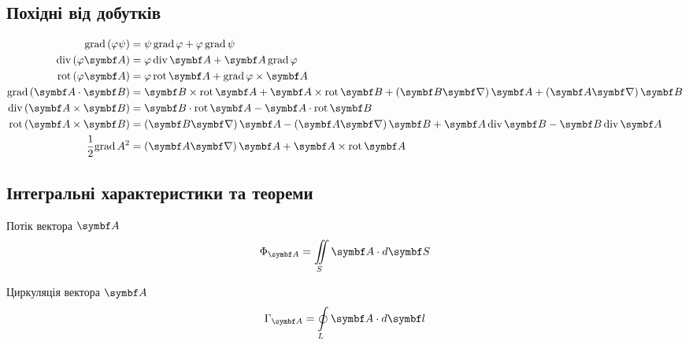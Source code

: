 \subsection{Похідні від добутків}

\begin{align}
	\mathrm{grad}\,(\phi \psi)             & = \psi\,\mathrm{grad}\,\phi +\phi\, \mathrm{grad}\,\psi                                                                                                                           \\
	\mathrm{div}\,(\phi \vect{A})          & = \phi\,\mathrm{div}\,\vect{A} + \vect{A}\,\mathrm{grad}\,\phi                                                                                                                    \\
	\mathrm{rot}\,(\phi \vect{A})          & = \phi\,\mathrm{rot}\,\vect{A} + \mathrm{grad}\,\phi \times \vect{A}                                                                                                              \\
	\mathrm{grad}\,(\vect{A}\cdot\vect{B}) & = \vect{B}\times\mathrm{rot}\,\vect{A} + \vect{A}\times\mathrm{rot}\,\vect{B} + \left( \vect{B}\vect{\nabla}\right)\vect{A} + \left( \vect{A}\vect{\nabla}\right)\vect{B}         \\
	\mathrm{div}\,(\vect{A}\times\vect{B}) & = \vect{B}\cdot\mathrm{rot}\,\vect{A} - \vect{A}\cdot\mathrm{rot}\,\vect{B}                                                                                                       \\
	\mathrm{rot}\,(\vect{A}\times\vect{B}) & = \left( \vect{B}\vect{\nabla}\right)\vect{A} - \left( \vect{A}\vect{\nabla}\right)\vect{B} + 	\vect{A}\,\mathrm{div}\,\vect{B} - \vect{B}\,\mathrm{div}\,\vect{A} \label{rotvect} \\
	\frac12\mathrm{grad}\,A^2              & =  \left( \vect{A}\vect{\nabla}\right)\vect{A} + \vect{A}\times\mathrm{rot}\,\vect{A}
\end{align}


\subsection{Інтегральні характеристики та теореми}
Потік вектора $\vect{A}$
\begin{equation}\label{flux}
	\Phi_{\vect{A}} = \iint\limits_S \vect{A}\cdot d\vect{S}
\end{equation}

Циркуляція вектора $\vect{A}$
\begin{equation}\label{circulation}
	\Gamma_{\vect{A}} = \oint\limits_L \vect{A}\cdot d\vect{l}
\end{equation}

